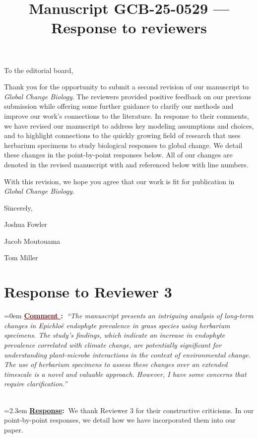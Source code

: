 \documentclass[12pt]{article}
\newcounter{cN}
\newcommand{\comment}[1]{
	\vspace{2em}
	\refstepcounter{cN} %
	\noindent \hangindent=0em \textbf{\textcolor{Maroon}{\uline{Comment \thecN}:~}}\emph{``#1''}
	}
\newcommand{\response}[1]{
	\\[0.25em]
	\hangindent=2.3em \textbf{\textcolor{NavyBlue}{\uline{Response}:~}}#1
	}
\newcommand{\revise}[1]{{\color{Mahogany}{#1}}}
\newcommand{\linesref}[2]{
		\\[0.25em]
	\hangindent=2.3em {\color{Mahogany} Line(s): \ref{#1} - \ref{#2}}
}
\begin{document}
\title{Manuscript GCB-25-0529 --- Response to reviewers}

\maketitle
\noindent To the editorial board,


Thank you for the opportunity to submit a second revision of our manuscript to \emph{Global Change Biology}. 
The reviewers provided positive feedback on our previous submission while offering some further guidance to clarify our methods and improve our work's connections to the literature. 
In response to their comments, we have revised our manuscript to address key modeling assumptions and choices, and to highlight connections to the quickly growing field of research that uses herbarium specimens to study biological responses to global change. We detail these changes in the point-by-point responses below.
All of our changes are denoted in the revised manuscript with \revise{Mahogany font} and referenced below with line numbers. 

With this revision, we hope you agree that our work is fit for publication in \emph{Global Change Biology}.


\vspace{2em}
Sincerely,

Joshua Fowler

Jacob Moutouama

Tom Miller



\newpage

\section{Response to Reviewer 3}
\vspace{-2em}




\comment{The manuscript presents an intriguing analysis of long-term changes in Epichloë endophyte prevalence in grass species using herbarium specimens. The study's findings, which indicate an increase in endophyte prevalence correlated with climate change, are potentially significant for understanding plant-microbe interactions in the context of environmental change. The use of herbarium specimens to assess these changes over an extended timescale is a novel and valuable approach. However, I have some concerns that require clarification.}
\response{We thank Reviewer 3 for their constructive criticisms. In our point-by-point responses, we detail how we have incorporated them into our paper.}
\end{document}
